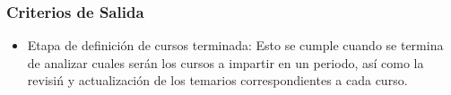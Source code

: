 \subsubsection{Criterios de Salida}			%

\begin{itemize}						%
           \item Etapa de definici\'on de cursos terminada: Esto se cumple cuando se termina de analizar cuales ser\'an los cursos a impartir en un periodo, as\'i como la revisi\'n y actualizaci\'on de los temarios correspondientes a cada curso.
\end{itemize}